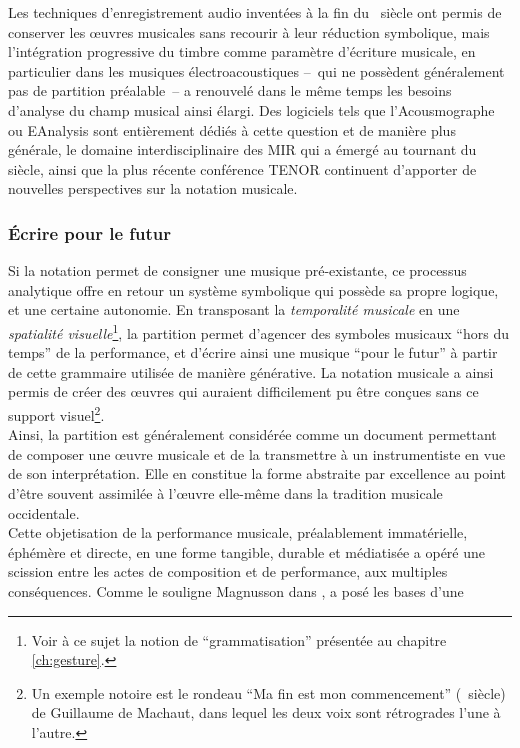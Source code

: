 \noindent Les techniques d'enregistrement audio inventées à la fin du ~siècle ont permis de conserver les œuvres musicales sans recourir à leur réduction symbolique, mais l'intégration progressive du timbre comme paramètre d'écriture musicale, en particulier dans les musiques électroacoustiques --~qui ne possèdent généralement pas de partition préalable~-- a renouvelé dans le même temps les besoins d'analyse du champ musical ainsi élargi. Des logiciels tels que l'Acousmographe \cite{favreau_lacousmographe_2010} ou EAnalysis \cite{couprie_eanalysis:_2016} sont entièrement dédiés à cette question et de manière plus générale, le domaine interdisciplinaire des \gls{MIR} qui a émergé au tournant du siècle, ainsi que la plus récente conférence \gls{TENOR} continuent d'apporter de nouvelles perspectives sur la notation musicale.

\subsubsection{Écrire pour le futur}

\noindent Si la notation permet de consigner une musique pré-existante, ce processus analytique offre en retour un système symbolique qui possède sa propre logique, et une certaine autonomie. En transposant la \textit{temporalité musicale} en une \textit{spatialité visuelle}\footnote{Voir à ce sujet la notion de ``grammatisation'' présentée au chapitre \ref{ch:gesture}.}, la partition permet d'agencer des symboles musicaux ``hors du temps'' de la performance, et d'écrire ainsi une musique ``pour le futur'' à partir de cette grammaire utilisée de manière générative. La notation musicale a ainsi permis de créer des œuvres qui auraient difficilement pu être conçues sans ce support visuel\footnote{Un exemple notoire est le rondeau ``Ma fin est mon commencement'' (~siècle) de Guillaume de Machaut, dans lequel les deux voix sont rétrogrades l'une à l'autre.}.\\
\indent Ainsi, la partition est généralement considérée comme un document permettant de composer une œuvre musicale et de la transmettre à un instrumentiste en vue de son interprétation. Elle en constitue la forme abstraite par excellence au point d'être souvent assimilée à l'œuvre elle-même dans la tradition musicale occidentale.\\
\indent Cette objetisation de la performance musicale, préalablement immatérielle, éphémère et directe, en une forme tangible, durable et médiatisée a opéré une scission entre les actes de composition et de performance, aux multiples conséquences. Comme le souligne Magnusson dans \cite{magnusson_algorithms_2011},  a posé les bases d'une 

